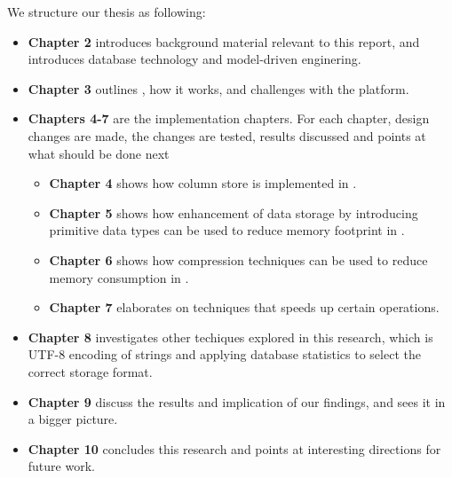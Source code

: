 We structure our thesis as following:
\begin{itemize}
  \item \textbf{Chapter 2} introduces background material relevant to this report, and introduces database technology and model-driven enginering. 
  \item \textbf{Chapter 3} outlines \gap, how it works, and challenges with the platform.
  \item \textbf{Chapters 4-7} are the implementation chapters. For each chapter, design changes are made, the changes are tested, results discussed and points at what should be done next
  \begin{itemize}
    \item \textbf{Chapter 4} shows how column store is implemented in \gap.
    \item \textbf{Chapter 5} shows how enhancement of data storage by introducing primitive data types can be used to reduce memory footprint in \gap.
    \item \textbf{Chapter 6} shows how compression techniques can be used to reduce memory consumption in \gap.
    \item \textbf{Chapter 7} elaborates on techniques that speeds up certain operations.
  \end{itemize}
  \item \textbf{Chapter 8} investigates other techiques explored in this research, which is UTF-8 encoding of strings and applying database statistics to select the correct storage format.
  \item \textbf{Chapter 9} discuss the results and implication of our findings, and sees it in a bigger picture.
  \item \textbf{Chapter 10} concludes this research and points at interesting directions for future work.
\end{itemize}



